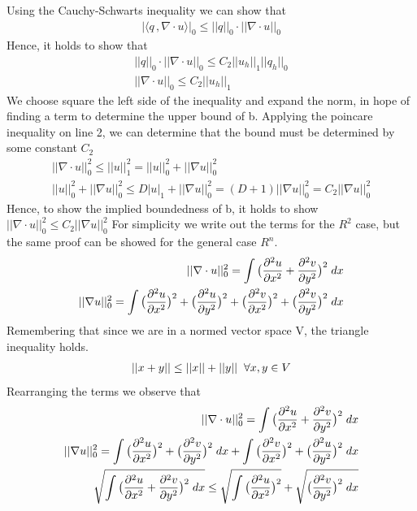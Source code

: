 \documentclass[a4paper,norsk]{article}
\begin{document}
Using the Cauchy-Schwarts inequality we can show that
\begin{align*}
| \langle q \,, \nabla \cdot u \rangle |_0 \leq ||q||_0 \cdot ||\nabla \cdot u||_0
\end{align*}
Hence, it holds to show that
\begin{align*}
  ||q||_0 \cdot ||\nabla \cdot u||_0 \leq C_2 ||u_h||_{1} ||q_h||_{0} \\
  ||\nabla \cdot u||_0 \leq C_2 ||u_h||_{1} 
\end{align*}
We choose square the left side of the inequality and expand the norm, in hope of finding a term to
determine the upper bound of b. Applying the poincare inequality on line 2, we can determine that the bound must be
determined by some constant $C_2$
\begin{align*}
||\nabla \cdot u||_0^2 \leq ||u||_1^2 = ||u||_0^2 + ||\nabla u ||_0^2 \\
||u||_0^2 + ||\nabla u ||_0^2 \leq D |u|_1 + ||\nabla u||_0^2 = (D + 1)||\nabla u ||_0^2 = C_2||\nabla u ||_0^2
\end{align*}
Hence, to show the implied boundedness of b, it holds to show $||\nabla \cdot u||_0^2 \leq C_2||\nabla u ||_0^2$
For simplicity we write out the terms for the $R^2$ case, but the same proof can be showed for the general case $R^n$. 
\begin{align*}
 ||\nabla \cdot u||_0^2 = \int \big(\frac{\partial^2 u}{\partial x^2} + \frac{\partial^2 v}{\partial y^2}\big)^2 \hspace{1mm} dx \\
 ||\nabla u||_0^2 = \int \big(\frac{\partial^2 u}{\partial x^2}\big)^2 + \big(\frac{\partial^2 u}{\partial y^2} \big)^2 + 
 \big(\frac{\partial^2 v}{\partial x^2} \big)^2 + \big( \frac{\partial^2 v}{\partial y^2} \big)^2 \hspace{1mm} dx
\end{align*}
Remembering that since we are in a normed vector space V, the triangle inequality holds.
\begin{align*}
||x + y || \leq ||x|| + ||y|| \hspace{2mm} \forall x,y \in V
\end{align*}
Rearranging the terms we observe that 
\begin{align*}
 ||\nabla \cdot u||_0^2 = \int \big(\frac{\partial^2 u}{\partial x^2} + \frac{\partial^2 v}{\partial y^2}\big)^2 \hspace{1mm} dx \\
 ||\nabla u||_0^2 = \int \big(\frac{\partial^2 u}{\partial x^2}\big)^2 
 +  \big( \frac{\partial^2 v}{\partial y^2} \big)^2 \hspace{1mm} dx
 + \int \big(\frac{\partial^2 v}{\partial x^2} \big)^2 + 
  \big(\frac{\partial^2 u}{\partial y^2} \big)^2  \hspace{1mm} dx \\
  \sqrt{ \int \big(\frac{\partial^2 u}{\partial x^2} + \frac{\partial^2 v}{\partial y^2}\big)^2 \hspace{1mm} dx }\leq 
 \sqrt{ \int \big(\frac{\partial^2 u}{\partial x^2}\big)^2} 
 + \sqrt{ \big( \frac{\partial^2 v}{\partial y^2} \big)^2 \hspace{1mm} dx }
\end{align*}
\end{document}
